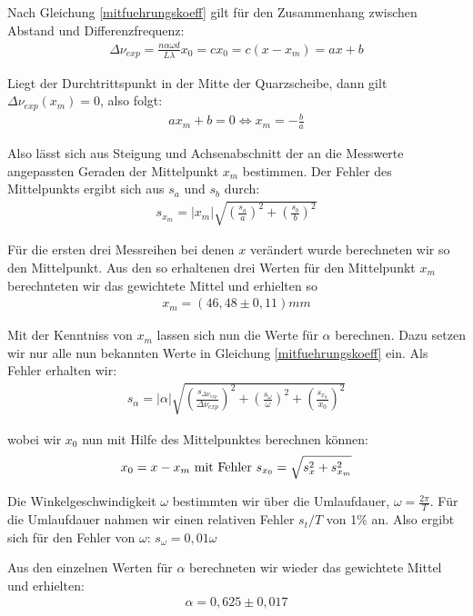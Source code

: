 \documentclass[12pt]{article}
\begin{document}
Nach Gleichung \ref{mitfuehrungskoeff} gilt für den Zusammenhang zwischen Abstand und Differenzfrequenz:
\begin{align}
 \varDelta \nu_{exp}=\frac{n\alpha\omega d}{L \lambda}x_0=cx_0=c(x-x_m)=ax+b
\end{align}

Liegt der Durchtrittspunkt in der Mitte der Quarzscheibe, dann gilt $\varDelta\nu_{exp}(x_m)=0$, also
folgt:
\begin{align}
 ax_m+b=0 \Leftrightarrow x_m=-\frac{b}{a}
\end{align}

Also lässt sich aus Steigung und Achsenabschnitt der an die Messwerte angepassten Geraden der Mittelpunkt $x_m$ bestimmen. Der Fehler des Mittelpunkts ergibt sich aus $s_a$ und $s_b$ durch:
\begin{align}
  s_{x_m}=|x_m|\sqrt{\left( \frac{s_a}{a}\right)^2 + \left( \frac{s_b}{b}\right) ^2 }
\end{align}

Für die ersten drei Messreihen bei denen $x$ verändert wurde berechneten wir so den Mittelpunkt. Aus den so erhaltenen drei Werten für den Mittelpunkt $x_m$ berechnteten wir das gewichtete Mittel und erhielten so
\begin{align}
 x_m=(46,48 \pm 0,11) mm
\end{align}

Mit der Kenntniss von $x_m$ lassen sich nun die Werte für $\alpha$ berechnen. Dazu setzen wir nur alle nun bekannten Werte in Gleichung \ref{mitfuehrungskoeff} ein. Als Fehler erhalten wir:
\begin{align}
 s_{\alpha} = |\alpha|\sqrt{\left( \frac{s_{\varDelta\nu_{exp}}}{\varDelta\nu_{exp}}\right)^2+\left( \frac{s_{\omega}}{\omega}\right)^2+\left( \frac{s_{x_0}}{x_0}\right)^2}
\end{align}

wobei wir $x_0$ nun mit Hilfe des Mittelpunktes berechnen können:
\begin{align}
 x_0=x-x_m \textnormal{  mit Fehler  } s_{x_0}=\sqrt{s_x^2+s_{x_m}^2}
\end{align}

Die Winkelgeschwindigkeit $\omega$ bestimmten wir über die Umlaufdauer, $\omega=\frac{2\pi}{T}$. Für die Umlaufdauer nahmen wir einen relativen Fehler $s_t/T$ von 1\% an. Also ergibt sich für den Fehler von $\omega$: $s_{\omega}=0,01\omega$

Aus den einzelnen Werten für $\alpha$ berechneten wir wieder das gewichtete Mittel und erhielten:
\begin{align}
 \alpha= 0,625 \pm 0,017
\end{align}
\end{document}
